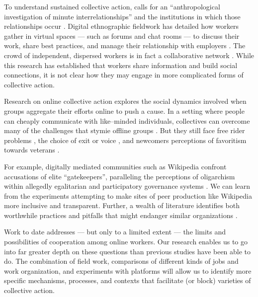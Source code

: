 \documentclass[11pt]{article}
\begin{document}
To understand sustained collective action,
\citet{russell1982collective}
calls for an
``anthropological investigation of minute interrelationships''
and the institutions in which those relationships occur
\citep[see also
\citet{hirschman1970exit,ostrom1990governing,polletta2002freedom}
]{russell1982collective}.
Digital ethnographic fieldwork has detailed how workers gather in virtual spaces
--- such as forums and chat rooms ---
to
  discuss their work,
  share best practices, and
  manage their relationship with employers
\citep{martin2014being}.
The crowd of independent,
dispersed workers is in fact a collaborative network
\citep{crowdcollab}.
While this research has established that
  workers share information and build social connections,
it is not clear how they may engage in more complicated forms of collective action.

Research on online collective action explores
the social dynamics involved when groups aggregate their efforts online to push a cause.
In a setting where people can cheaply communicate with like--minded individuals,
collectives can overcome many of the challenges that stymie offline groups
\citep{earl2011digitally}.
But they still face free rider problems
\citep{olsonlogic},
the choice of exit or voice
\citep{hirschman1970exit},
and newcomers perceptions of favoritism towards veterans
\citep{polletta2002freedom}.

For example,
digitally mediated communities
such as Wikipedia
confront accusations of elite ``gatekeepers'',
paralleling the perceptions of oligarchism within allegedly egalitarian and
participatory governance systems
\citep{keegan2010egalitarians}.
We can learn from the experiments attempting to make sites of peer production
like Wikipedia
more inclusive and transparent.
Further,
a wealth of literature identifies both
  worthwhile practices and
  pitfalls that might endanger similar organizations
\citep{weber2004success,mockus2002two}.

Work to date addresses
--- but only to a limited extent ---
the limits and possibilities of cooperation among online workers.
Our research enables us to go into far greater depth on these questions
than previous studies have been able to do.
The combination of field work,
comparisons of different kinds of jobs and work organization,
and experiments with platforms will allow us to identify more specific
  mechanisms,
  processes, and
  contexts
that facilitate (or block) varieties of collective action.
\end{document}
